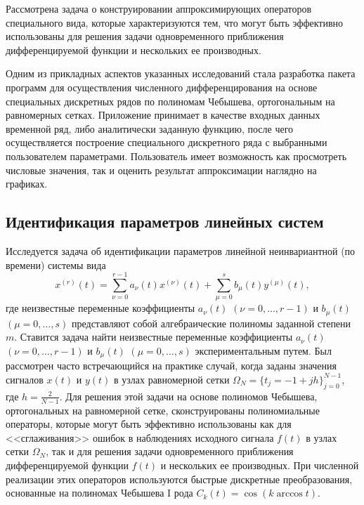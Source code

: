Рассмотрена задача о конструировании аппроксимирующих операторов специального вида, которые характеризуются тем, что могут быть эффективно использованы для решения задачи одновременного приближения дифференцируемой функции и нескольких ее производных.

Одним из прикладных аспектов указанных исследований стала разработка пакета программ для осуществления численного дифференцирования на основе специальных дискретных рядов по полиномам Чебышева, ортогональным на равномерных сетках. Приложение принимает в качестве входных данных временной ряд, либо аналитически заданную функцию, после чего осуществляется построение специального дискретного ряда с выбранными пользователем параметрами. Пользователь имеет возможность как просмотреть числовые значения, так и оценить результат аппроксимации наглядно на графиках.


\subsection{Идентификация параметров линейных систем}



Исследуется задача об идентификации параметров линейной неинвариантной (по времени) системы вида
\begin{equation*}
x^{(r)}(t)=\sum_{\nu=0}^{r-1}a_\nu(t)x^{(\nu)}(t)+\sum_{\mu=0}^s b_\mu(t)y^{(\mu)}(t),
\end{equation*}
где неизвестные переменные коэффициенты $a_\nu(t)$ $(\nu=0,\ldots,r-1)$ и $b_\mu(t)$ $(\mu=0,\ldots,s)$ представляют собой алгебраические полиномы  заданной степени $m$. Ставится задача  найти неизвестные переменные коэффициенты $a_\nu(t)$ $(\nu=0,\ldots,r-1)$ и $b_\mu(t)$ $(\mu=0,\ldots,s)$ экспериментальным путем.
Был рассмотрен часто встречающийся на практике случай, когда заданы значения сигналов $x(t)$ и  $y(t)$ в узлах равномерной сетки $\Omega_N=\{t_j=-1+jh\}_{j=0}^{N-1}$, где $h=\frac2{N-1}$.
Для решения этой задачи на основе полиномов Чебышева, ортогональных на равномерной сетке, сконструированы полиномиальные операторы, которые могут быть эффективно использованы как для <<сглаживания>> ошибок в наблюдениях исходного сигнала $f(t)$ в узлах сетки $\Omega_N$, так и для решения задачи одновременного приближения дифференцируемой функции $f(t)$ и нескольких ее производных. При численной реализации этих операторов используются быстрые дискретные преобразования, основанные на полиномах Чебышева I рода $C_k(t) = \cos (k \arccos t)$.


